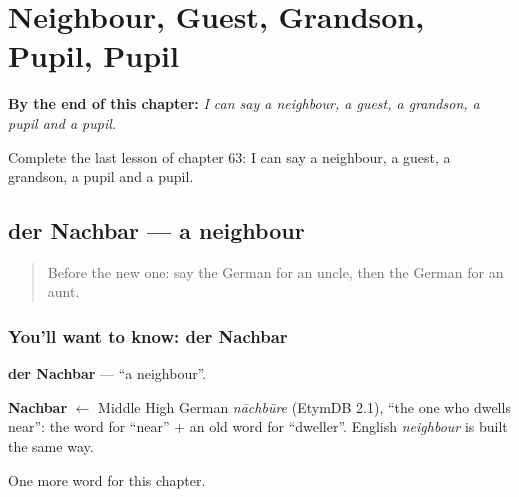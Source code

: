 
\chapter{Neighbour, Guest, Grandson, Pupil, Pupil}
\label{ch:ge-neighbour-guest-grandson-pupil-pupil}

\begin{chapteropening}
\textbf{By the end of this chapter:} \emph{I can say a neighbour, a guest, a grandson, a pupil and a pupil.}

Complete the last lesson of chapter 63: I can say a neighbour, a guest, a grandson, a pupil and a pupil.
\end{chapteropening}

\section[der Nachbar]{der Nachbar — a neighbour}

\label{lesson:GE-C63-nachbar}



\begin{quote}
Before the new one: say the German for an uncle, then the German for an aunt.
\end{quote}

\subsection*{You'll want to know: der Nachbar}
\textbf{der Nachbar} — \textquotedblleft{}a neighbour\textquotedblright{}.

\begin{cousinweb}
\textbf{Nachbar} $\leftarrow$ Middle High German \emph{nāchbūre} (EtymDB 2.1), \textquotedblleft{}the one who dwells near\textquotedblright{}: the word for \textquotedblleft{}near\textquotedblright{} + an old word for \textquotedblleft{}dweller\textquotedblright{}. English \emph{neighbour} is built the same way.
\end{cousinweb}

\begin{grammarlens}[title={What you've built}]
One more word for this chapter.
\end{grammarlens}

